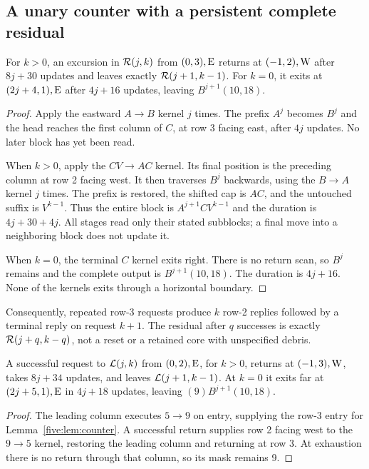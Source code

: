 \subsection{A unary counter with a persistent complete residual}
\begin{lemma}\label{five:lem:counter}
For $k>0$, an excursion in $\mathcal R(j,k)$ from $(0,3),\mathrm E$ returns at $(-1,2),\mathrm W$
after $8j+30$ updates and leaves exactly $\mathcal R(j+1,k-1)$. For $k=0$, it exits
at $(2j+4,1),\mathrm E$ after $4j+16$ updates, leaving $B^{j+1}(10,18)$.
\end{lemma}
\begin{proof}
Apply the eastward $A\to B$ kernel $j$ times. The prefix $A^j$ becomes $B^j$
and the head reaches the first column of $C$, at row 3 facing east, after $4j$
updates. No later block has yet been read.

When $k>0$, apply the $CV\to AC$ kernel. Its final position is the preceding
column at row 2 facing west. It then traverses $B^j$ backwards, using the
$B\to A$ kernel $j$ times. The prefix is restored, the shifted cap is $AC$,
and the untouched suffix is $V^{k-1}$. Thus the entire block is
$A^{j+1}CV^{k-1}$ and the duration is $4j+30+4j$. All stages read only their
stated subblocks; a final move into a neighboring block does not update it.

When $k=0$, the terminal $C$ kernel exits right. There is no return scan, so
$B^j$ remains and the complete output is $B^{j+1}(10,18)$. The duration is
$4j+16$. None of the kernels exits through a horizontal boundary.
\end{proof}

Consequently, repeated row-3 requests produce $k$ row-2 replies followed by a
terminal reply on request $k+1$. The residual after $q$ successes is exactly
$\mathcal R(j+q,k-q)$, not a reset or a retained core with unspecified debris.

\begin{lemma}\label{five:lem:port}
A successful request to $\mathcal L(j,k)$ from $(0,2),\mathrm E$, for $k>0$, returns at
$(-1,3),\mathrm W$, takes $8j+34$ updates, and leaves $\mathcal L(j+1,k-1)$. At $k=0$
it exits far at $(2j+5,1),\mathrm E$ in $4j+18$ updates, leaving
$(9)B^{j+1}(10,18)$.
\end{lemma}
\begin{proof}
The leading column executes $5\to9$ on entry, supplying the row-3 entry for
Lemma~\ref{five:lem:counter}. A successful return supplies row 2 facing west to the
$9\to5$ kernel, restoring the leading column and returning at row 3. At
exhaustion there is no return through that column, so its mask remains 9.
\end{proof}

